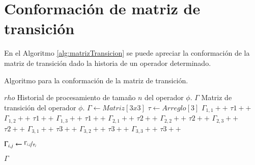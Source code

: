 \chapter{Conformación de matriz de transición}
\label{apendice:matrizTransicion}

En el Algoritmo \ref{alg:matrizTransicion} se puede apreciar la conformación de la matriz de transición dado la historia de un operador determinado.

\begin{algorithm}[!hb]
	\caption{Algoritmo para la conformación de la matriz de transición.}
	\label{alg:matrizTransicion}
	\begin{algorithmic}[1]
	\REQUIRE $rho$ Historial de procesamiento de tamaño $n$ del operador $\phi$.
	\ENSURE $\Gamma$ Matriz de transición del operador $\phi$.
	\STATE $\Gamma \leftarrow Matriz[3x3]$ 
	\STATE $\tau \leftarrow Arreglo[3]$ 
			\STATE $\Gamma_{1,1}++$
			\STATE $\tau{1}++$
			\STATE $\Gamma_{1,2}++$
			\STATE $\tau{1}++$
			\STATE $\Gamma_{1,3}++$
			\STATE $\tau{1}++$
			\STATE $\Gamma_{2,1}++$
			\STATE $\tau{2}++$
			\STATE $\Gamma_{2,2}++$
			\STATE $\tau{2}++$
			\STATE $\Gamma_{2,3}++$
			\STATE $\tau{2}++$
			\STATE $\Gamma_{3,1}++$
			\STATE $\tau{3}++$
			\STATE $\Gamma_{3,2}++$
			\STATE $\tau{3}++$
		\ELSE
			\STATE $\Gamma_{3,3}++$
			\STATE $\tau{3}++$
		\ENDIF	
	\ENDFOR

				\STATE $\Gamma_{i,j} \leftarrow \nicefrac{\Gamma_{i,j}}{\tau_{i}}$
			\ENDFOR
		\ENDIF
	\ENDFOR
	
	\RETURN $\Gamma$ 
	\end{algorithmic}
\end{algorithm}